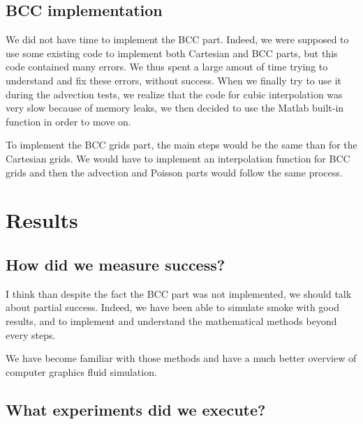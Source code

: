 \documentclass[accepted,single]{gipaper}
\begin{document}


\subsection{BCC implementation}
We did not have time to implement the BCC part. Indeed, we were supposed to use some existing code to implement both Cartesian and BCC parts, but this code contained many errors. We thus spent a large amout of time trying to understand and fix these errors, without success. When we finally try to use it during the advection tests, we realize that the code for cubic interpolation was very slow because of memory leaks, we then decided to use the Matlab built-in function in order to move on.

To implement the BCC grids part, the main steps would be the same than for the Cartesian grids. We would have to implement an interpolation function for BCC grids and then the advection and Poisson parts would follow the same process.

\section{Results}

\subsection{How did we measure success?}

I think than despite the fact the BCC part was not implemented, we should talk about partial success. Indeed, we have been able to simulate smoke with good results, and to implement and understand the mathematical methods beyond every steps. 

We have become familiar with those methods and have a much better overview of computer graphics fluid simulation.

\subsection{What experiments did we execute?}
\end{document}
